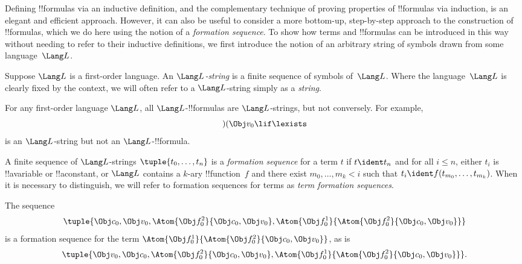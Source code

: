 \documentclass[../../../include/open-logic-section]{subfiles}
\begin{document}


Defining !!{formula}s via an inductive definition, and the
complementary technique of proving properties of !!{formula}s via
induction, is an elegant and efficient approach. However, it can
also be useful to consider a more bottom-up, step-by-step approach
to the construction of !!{formula}s, which we do here using the
notion of a \emph{formation sequence}.
%
To show how terms and !!{formula}s can be introduced in this way
without needing to refer to their inductive definitions, we first
introduce the notion of an arbitrary string of symbols drawn from
some language~$\Lang L$.

\begin{defn}[Strings]
Suppose $\Lang L$ is a first-order language. An \emph{$\Lang
L$-string} is a finite sequence of symbols of~$\Lang L$. Where the
language~$\Lang L$ is clearly fixed by the context, we will often
refer to a $\Lang L$-string simply as a \emph{string}.
\end{defn}

\begin{ex}
For any first-order language $\Lang L$, all
$\Lang L$-!!{formula}s are $\Lang L$-strings, but not
conversely. For example, \[)(\Obj v_0\lif\lexists\] is an
$\Lang L$-string but not an $\Lang L$-!!{formula}.
\end{ex}

\begin{defn}
A finite sequence of $\Lang L$-strings $\tuple{t_0,\dotsc,t_n}$ is a
\emph{formation sequence} for a term $t$ if $t \ident t_n$ and for all
$i \leq n$, either $t_i$ is !!a{variable} or !!a{constant}, or $\Lang
L$ contains a $k$-ary !!{function}~$f$ and there exist
$m_0,\dotsc,m_k < i$ such that $t_i \ident f(t_{m_0},\dotsc,t_{m_k})$.
When it is necessary to distinguish, we will refer to formation
sequences for terms as \emph{term formation sequences}.
\end{defn}

\begin{ex}
The sequence
\[
    \tuple{\Obj c_0, \Obj v_0, \Atom{\Obj f^2_0}{\Obj c_0, \Obj v_0}, \Atom{\Obj f^1_0}{\Atom{\Obj f^2_0}{\Obj c_0, \Obj v_0}}}
\]
is a formation sequence for the term $\Atom{\Obj f^1_0}{\Atom{\Obj
f^2_0}{\Obj c_0, \Obj v_0}}$, as is
\[
    \tuple{\Obj v_0, \Obj c_0, \Atom{\Obj f^2_0}{\Obj c_0, \Obj v_0}, \Atom{\Obj f^1_0}{\Atom{\Obj f^2_0}{\Obj c_0, \Obj v_0}}}.
\]
\end{ex}
\end{document}
